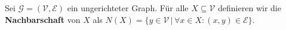 \begin{definition}[Nachbarschaft]\label{def:nachbarschaft}
Sei $\mathcal{G} = (\mathcal{V}, \mathcal{E})$ ein ungerichteter Graph.
Für alle $X \subseteq \mathcal{V}$ definieren wir die \textbf{Nachbarschaft}
von $X$ als $N(X) = \{y \in \mathcal{V} \,|\, \forall x \in X : (x, y) \in \mathcal{E}\}$.
\end{definition}
